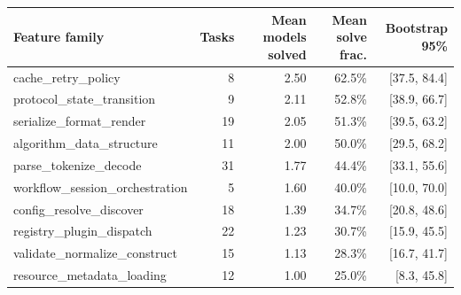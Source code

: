 \begin{tabular}{lrrrr}
\toprule
\textbf{Feature family} & \textbf{Tasks} & \textbf{Mean models solved} & \textbf{Mean solve frac.} & \textbf{Bootstrap 95\%} \\
\midrule
cache\_retry\_policy & 8 & 2.50 & 62.5\% & [37.5, 84.4] \\
protocol\_state\_transition & 9 & 2.11 & 52.8\% & [38.9, 66.7] \\
serialize\_format\_render & 19 & 2.05 & 51.3\% & [39.5, 63.2] \\
algorithm\_data\_structure & 11 & 2.00 & 50.0\% & [29.5, 68.2] \\
parse\_tokenize\_decode & 31 & 1.77 & 44.4\% & [33.1, 55.6] \\
workflow\_session\_orchestration & 5 & 1.60 & 40.0\% & [10.0, 70.0] \\
config\_resolve\_discover & 18 & 1.39 & 34.7\% & [20.8, 48.6] \\
registry\_plugin\_dispatch & 22 & 1.23 & 30.7\% & [15.9, 45.5] \\
validate\_normalize\_construct & 15 & 1.13 & 28.3\% & [16.7, 41.7] \\
resource\_metadata\_loading & 12 & 1.00 & 25.0\% & [8.3, 45.8] \\
\bottomrule
\end{tabular}
